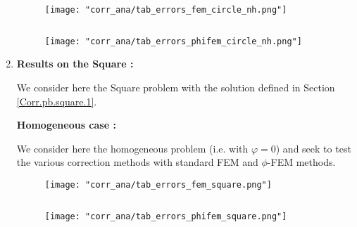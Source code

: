 \begin{enumerate}[label=\textbullet]
	\begin{minipage}{0.48\linewidth}
		\begin{figure}[H]
			\centering
			\texttt{[image: "corr\_ana/tab\_errors\_fem\_circle\_nh.png"]}
			\label{tab_errors_fem_circle_nh}
		\end{figure} 
	\end{minipage} $\qquad$
	\begin{minipage}{0.48\linewidth} \qquad 
		\begin{figure}[H]
			\centering
			\texttt{[image: "corr\_ana/tab\_errors\_phifem\_circle\_nh.png"]}
			\label{tab_errors_phifem_circle_nh}
		\end{figure} 
	\end{minipage}
	
	\item \textbf{Results on the Square :}
	
	We consider here the Square problem with the solution defined in Section \ref{Corr.pb.square.1}.
	
	\textbf{Homogeneous case :}
	
	We consider here the homogeneous problem (i.e. with $\varphi=0$) and seek to test the various correction methods with standard FEM and $\phi$-FEM methods.
	
	\begin{minipage}{0.48\linewidth}
		\begin{figure}[H]
			\centering
			\texttt{[image: "corr\_ana/tab\_errors\_fem\_square.png"]}
			\label{tab_errors_fem_square}
		\end{figure} 
	\end{minipage} $\qquad$
	\begin{minipage}{0.48\linewidth} \qquad 
		\begin{figure}[H]
			\centering
			\texttt{[image: "corr\_ana/tab\_errors\_phifem\_square.png"]}
			\label{tab_errors_phifem_square}
		\end{figure} 
	\end{minipage}
	

\end{enumerate}
